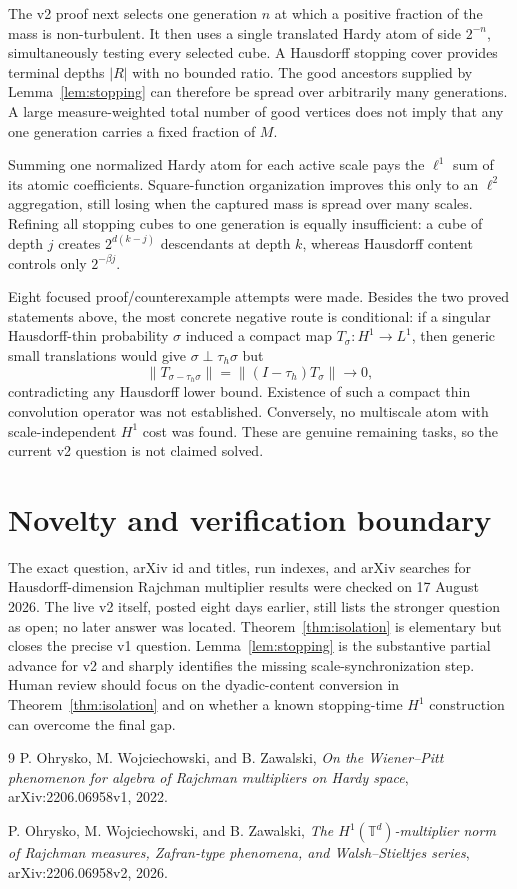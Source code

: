 \documentclass[11pt]{article}
\newcommand{\T}{\mathbb T}
\begin{document}
The v2 proof next selects one generation $n$ at which a positive fraction of
the mass is non-turbulent.  It then uses a single translated Hardy atom of
side $2^{-n}$, simultaneously testing every selected cube.  A Hausdorff
stopping cover provides terminal depths $|R|$ with no bounded ratio.  The
good ancestors supplied by Lemma~\ref{lem:stopping} can therefore be spread
over arbitrarily many generations.  A large measure-weighted total number of
good vertices does not imply that any one generation carries a fixed
fraction of $M$.

Summing one normalized Hardy atom for each active scale pays the $\ell^1$
sum of its atomic coefficients.  Square-function organization improves this
only to an $\ell^2$ aggregation, still losing when the captured mass is spread
over many scales.  Refining all stopping cubes to one generation is equally
insufficient: a cube of depth $j$ creates $2^{d(k-j)}$ descendants at depth
$k$, whereas Hausdorff content controls only $2^{-\beta j}$.

Eight focused proof/counterexample attempts were made.  Besides the two
proved statements above, the most concrete negative route is conditional:
if a singular Hausdorff-thin probability $\sigma$ induced a compact map
$T_\sigma:H^1\to L^1$, then generic small translations would give
$\sigma\perp\tau_h\sigma$ but
\[
 \|T_{\sigma-\tau_h\sigma}\|
   =\|(I-\tau_h)T_\sigma\|\longrightarrow0,
\]
contradicting any Hausdorff lower bound.  Existence of such a compact thin
convolution operator was not established.  Conversely, no multiscale atom
with scale-independent $H^1$ cost was found.  These are genuine remaining
tasks, so the current v2 question is not claimed solved.

\section{Novelty and verification boundary}

The exact question, arXiv id and titles, run indexes, and arXiv searches for
Hausdorff-dimension Rajchman multiplier results were checked on 17 August
2026.  The live v2 itself, posted eight days earlier, still lists the stronger
question as open; no later answer was located.  Theorem~\ref{thm:isolation}
is elementary but closes the precise v1 question.  Lemma~\ref{lem:stopping}
is the substantive partial advance for v2 and sharply identifies the missing
scale-synchronization step.  Human review should focus on the dyadic-content
conversion in Theorem~\ref{thm:isolation} and on whether a known stopping-time
$H^1$ construction can overcome the final gap.

\begin{thebibliography}{9}
P. Ohrysko, M. Wojciechowski, and B. Zawalski,
\emph{On the Wiener--Pitt phenomenon for algebra of Rajchman multipliers on
Hardy space}, arXiv:2206.06958v1, 2022.

P. Ohrysko, M. Wojciechowski, and B. Zawalski,
\emph{The $H^1(\T^d)$-multiplier norm of Rajchman measures, Zafran-type
phenomena, and Walsh--Stieltjes series}, arXiv:2206.06958v2, 2026.
\end{thebibliography}
\end{document}
